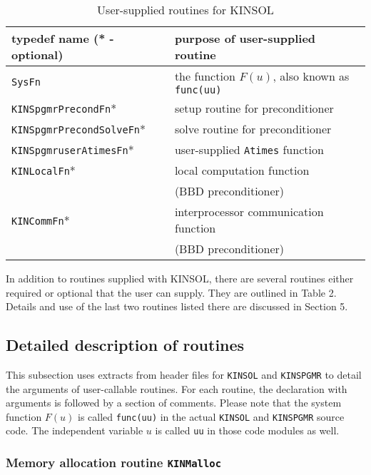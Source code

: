 \begin{table}[hkb]
\begin{center}
\begin{tabular}{|l|l|} \hline
typedef name  (* - optional) &  purpose of user-supplied routine \\ \hline \hline
{\tt SysFn} & the function ${F(u)}$, also known as {\tt func(uu)} \\  \hline
{\tt KINSpgmrPrecondFn}* & setup routine for preconditioner \\ \hline
{\tt KINSpgmrPrecondSolveFn}* & solve routine for preconditioner \\ \hline
{\tt KINSpgmruserAtimesFn}* & user-supplied {\tt Atimes} function \\ \hline
{\tt KINLocalFn}* & local computation function \\
 & (BBD preconditioner) \\ \hline
{\tt KINCommFn}* & interprocessor communication function \\
 & (BBD preconditioner) \\ \hline
\end{tabular}
\vspace{.1 in}
\caption{User-supplied routines for KINSOL}
\label{user-supplied-routines}
\end{center}
\end{table}

In addition to routines supplied with KINSOL, there are several routines
either required or optional that the user can supply. They are outlined in
Table 2. Details and use of the last two routines listed there are discussed
in Section 5.


\subsection{Detailed description of routines}

This subsection uses extracts from header files for {\tt KINSOL} and 
{\tt KINSPGMR} to detail the arguments of user-callable routines. For each
routine, the declaration with arguments is followed by a section of comments. 
Please note that the system function ${F(u)}$ is called {\tt func(uu)} in the 
actual {\tt KINSOL} and {\tt KINSPGMR} source code. The independent variable 
$u$ is called {\tt uu} in those code modules as well.

\subsubsection{Memory allocation routine {\tt KINMalloc}}

